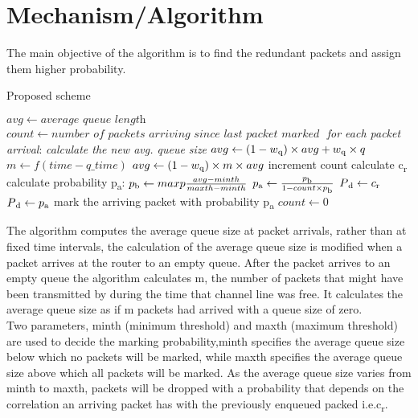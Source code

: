 \section{Mechanism/Algorithm}
The main objective of the algorithm is to find the redundant packets and assign them higher probability. 
\begin{algorithm}[h!]
\caption{Proposed scheme}
\begin{algorithmic}[1]
\Procedure{}{}
\State $avg \gets \textit{average queue length}$
\State $count \gets \textit{number of packets arriving since last packet marked }$
\BState \emph{for each packet arrival}:
\State \textit{calculate the new avg. queue size}
\State $avg \gets (1-w\textsubscript{q}) \times avg + w\textsubscript{q} \times q $  
\Else 
\State $m \gets f(time-q\_time)$
\State $avg \gets (1-w\textsubscript{q}) \times m \times avg $
\EndIf
{}
\State increment count
\State calculate c\textsubscript{r}
\State calculate probability p\textsubscript{a}:
\State $p\textsubscript{b} \gets maxp \frac{avg-minth}{maxth-minth}$
\State $p\textsubscript{a} \gets \frac{p\textsubscript{b}}{1-count \times p\textsubscript{b}}$
    \State $P\textsubscript{d} \gets c\textsubscript{r}$
    \Else
    \State $P\textsubscript{d} \gets p\textsubscript{a}$
    \EndIf
{}
    \State mark the arriving packet with probability p\textsubscript{a}
    \State $count \gets 0$
\EndIf
\EndProcedure
\end{algorithmic}
\end{algorithm}
The algorithm computes the average queue size at packet arrivals, rather than at fixed time intervals, the calculation of the average queue size is modified when a packet arrives at the router to an empty queue. After the packet arrives to an empty queue the algorithm calculates m, the number of packets that might have been transmitted by during the time that channel line was free. It calculates
the average queue size as if m packets had arrived with a queue size of zero.\\
Two parameters, minth (minimum threshold) and maxth (maximum threshold) are used to decide the marking probability,minth specifies the average queue size below which no packets will be marked, while maxth specifies the average queue size above which all packets will be marked. As the average queue size varies from minth to maxth, packets will be dropped with a probability that depends on the correlation an arriving packet has with the previously enqueued packed i.e.c\textsubscript{r}.
